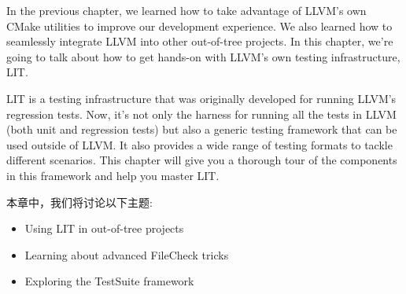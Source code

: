 In the previous chapter, we learned how to take advantage of LLVM's own CMake utilities to improve our development experience. We also learned how to seamlessly integrate LLVM into other out-of-tree projects. In this chapter, we're going to talk about how to get hands-on with LLVM's own testing infrastructure, LIT.

LIT is a testing infrastructure that was originally developed for running LLVM's regression tests. Now, it's not only the harness for running all the tests in LLVM (both unit and regression tests) but also a generic testing framework that can be used outside of LLVM. It also provides a wide range of testing formats to tackle different scenarios. This chapter will give you a thorough tour of the components in this framework and help you master LIT.

本章中，我们将讨论以下主题:

\begin{itemize}
	\item Using LIT in out-of-tree projects
	\item Learning about advanced FileCheck tricks
	\item Exploring the TestSuite framework
\end{itemize}









































